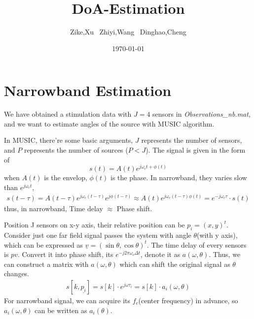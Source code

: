 \documentclass[UTF8]{article}
\title{\bf DoA-Estimation}
\author{Zike,Xu \ Zhiyi,Wang \ Dinghao,Cheng}
\date{\today}
\newcommand{\ul}{\underline}
\begin{document}
\maketitle
\tableofcontents

\newpage

\section{Narrowband Estimation}
\hspace{0.5em} We have obtained a stimulation data with $J = 4$ sensors in \emph{Observations\_nb.mat}, and we want to estimate angles of the source with MUSIC algorithm.

In MUSIC, there're some basic arguments, $J$ represents the number of sensors, and $P$ represents the number of sources ($P < J$).
The signal is given in the form of
\begin{equation}
    s(t) = A(t)e^{j\omega_c t + \phi(t)}
\end{equation}
when $A(t)$ is the envelop, $\phi(t)$ is the phase. In narrowband, they varies slow than $e^{j \omega_c t}$,
\begin{gather}
    s(t - \tau) = A(t - \tau) e^{j\omega_c(t - \tau)}e^{j\phi(t - \tau)} \approx A(t)e^{j\omega_c(t - \tau) \phi(t)} = e^{-j\omega_c\tau}\cdot s(t)
\end{gather}
thus, in narrowband, Time delay $\approx$ Phase shift.

Position J sensors on x-y axis, their relative position can be $p_i = (x, y)^t$. Consider just one far field signal passes the system with angle $\theta$(with y axis), which can be expressed as $\ul{v} = (\sin \theta, \cos \theta)^t$. The time delay of every sensors is $p v$. Convert it into phase shift, its $e^{-j 2 \pi \omega_c \Delta t}$, denote it as $a(\omega, \theta)$. Thus, we can construct a matrix with $a(\omega, \theta)$ which can shift the original signal as $\theta$ changes.
\begin{gather}
    s[k, \ul{p_i}] = s[k] \cdot e^{j \omega \tau_i} = s[k] \cdot a_i(\omega, \theta)
\end{gather}
For narrowband signal, we can acquire its $f_c$(center frequency) in advance, so $a_i(\omega, \theta)$ can be written as $a_i(\theta)$.
\end{document}
